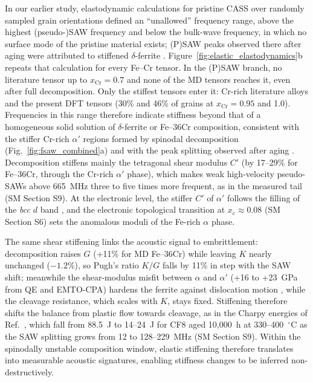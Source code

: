 \documentclass[final,3p,times]{elsarticle}
\begin{document}
In our earlier study, elastodynamic calculations for pristine CASS over randomly sampled grain orientations defined an ``unallowed'' frequency range, above the highest (pseudo-)SAW frequency and below the bulk-wave frequency, in which no surface mode of the pristine material exists; (P)SAW peaks observed there after aging were attributed to stiffened $\delta$-ferrite \cite{al2023detecting}. Figure~\ref{fig:elastic_elastodynamics}b repeats that calculation for every Fe--Cr tensor. In the (P)SAW branch, no literature tensor up to $x_{\mathrm{Cr}}=0.7$ and none of the MD tensors reaches it, even after full decomposition. Only the stiffest tensors enter it: Cr-rich literature alloys and the present DFT tensors (30\% and 46\% of grains at $x_{\mathrm{Cr}}=0.95$ and 1.0). Frequencies in this range therefore indicate stiffness beyond that of a homogeneous solid solution of $\delta$-ferrite or Fe--36Cr composition, consistent with the stiffer Cr-rich $\alpha'$ regions formed by spinodal decomposition (Fig.~\ref{fig:fsaw_combined}a) and with the peak splitting observed after aging \cite{al2023detecting}. Decomposition stiffens mainly the tetragonal shear modulus $C'$ (by 17--29\% for Fe--36Cr, through the Cr-rich $\alpha'$ phase), which makes weak high-velocity pseudo-SAWs above 665~MHz three to five times more frequent, as in the measured tail (SM Section S9). At the electronic level, the stiffer $C'$ of $\alpha'$ follows the filling of the \textit{bcc} $d$ band \cite{soderlind1993theory}, and the electronic topological transition at $x_c\approx0.08$ (SM Section S6) sets the anomalous moduli of the Fe-rich $\alpha$ phase.

The same shear stiffening links the acoustic signal to embrittlement: decomposition raises $G$ (+11\% for MD Fe--36Cr) while leaving $K$ nearly unchanged ($-1.2\%$), so Pugh's ratio $K/G$ falls by 11\% \cite{pugh1954xcii} in step with the SAW shift; meanwhile the shear-modulus misfit between $\alpha$ and $\alpha'$ (+16 to +23~GPa from QE and EMTO-CPA) hardens the ferrite against dislocation motion \cite{kato1981hardening}, while the cleavage resistance, which scales with $K$, stays fixed. Stiffening therefore shifts the balance from plastic flow towards cleavage, as in the Charpy energies of Ref.~\cite{al2023detecting}, which fall from 88.5~J to 14--24~J for CF8 aged 10{,}000~h at 330--400~$^\circ$C as the SAW splitting grows from 12 to 128--229~MHz (SM Section S9). Within the spinodally unstable composition window, elastic stiffening therefore translates into measurable acoustic signatures, enabling stiffness changes to be inferred non-destructively.
\end{document}
